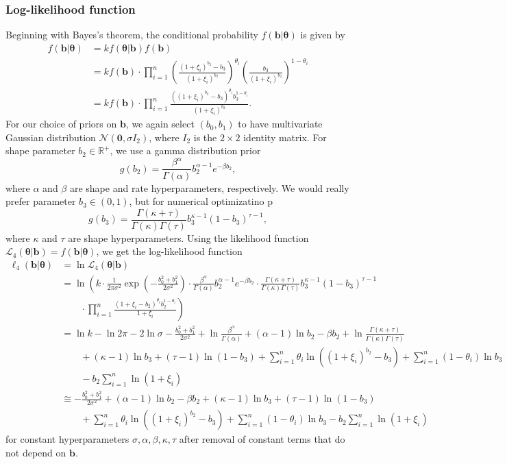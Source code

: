 \documentclass[11pt, letterpaper]{article}
\newcommand{\mbb}[1]{\mathbb{#1}}
\newcommand{\mc}[1]{\mathcal{#1}}
\begin{document}
\subsubsection{Log-likelihood function}
Beginning with Bayes's theorem, the conditional probability $f(\bm b | \bm \theta)$ is given by
\begin{align*}
f(\bm b | \bm \theta) &= k f(\bm \theta | \bm b) f(\bm b) \\
&= k f(\bm b) \cdot \prod_{i=1}^n \left( \frac{(1+\xi_i)^{b_2} -b_3}{(1+\xi_i)^{b_2}}\right)^{\theta_i}\left( \frac{b_3}{(1+\xi_i)^{b_2}}\right)^{1-\theta_i}\\
&= k f(\bm b) \cdot \prod_{i=1}^n \frac{\left((1+\xi_i)^{b_2} -b_3\right)^{\theta_i}b_3^{1-\theta_i}}{(1+\xi_i)^{b_2}}.
\end{align*}
For our choice of priors on $\bm b$, we again select $(b_0, b_1)$ to have multivariate Gaussian distribution $\mc N(\bm 0, \sigma I_2)$, where $I_2$ is the $2 \times 2$ identity matrix. For shape parameter $b_2 \in \mbb R^+$, we use a gamma distribution prior 
$$ g(b_2) = \frac{\beta^\alpha}{\Gamma(\alpha)} b_2^{\alpha-1}e^{-\beta b_2},$$
where $\alpha$ and $\beta$ are shape and rate hyperparameters, respectively. We would really prefer parameter $b_3 \in (0,1)$, but for numerical optimizatino p 
$$ g(b_3) = \frac{\Gamma (\kappa+\tau)}{\Gamma(\kappa)\Gamma(\tau)} b_3^{\kappa-1}(1-b_3)^{\tau -1},$$
where  $\kappa$ and $\tau$ are shape hyperparameters.
Using the likelihood function $\mc L_{4}(\bm \theta | \bm b) = f(\bm b | \bm \theta)$, we get the log-likelihood function 
\begin{align*}
\ell_{4}(\bm b | \bm \theta) &= \ln \mc L_{4}(\bm \theta | \bm b) \\
&= \ln \left( k \cdot \frac{1}{2\pi \sigma^2} \exp\left(-\frac{b_0^2+b_1^2}{2 \sigma^2}\right) \cdot  \frac{\beta^\alpha}{\Gamma(\alpha)} b_2^{\alpha-1}e^{-\beta b_2} \cdot \frac{\Gamma (\kappa+\tau)}{\Gamma(\kappa)\Gamma(\tau)} b_3^{\kappa-1}(1-b_3)^{\tau -1} \right. \\
&\qquad \cdot \left. \prod_{i=1}^n \frac{\left(1+\xi_i -b_2\right)^{\theta_i}b_2^{1-\theta_i}}{1+\xi_i}\right) \\
&= \ln k - \ln 2\pi -2 \ln \sigma - \frac{b_0^2 + b_1^2}{2\sigma^2} + \ln \frac{\beta^\alpha}{\Gamma(\alpha)} + (\alpha-1)\ln b_2 -\beta b_2 + \ln \frac{\Gamma(\kappa + \tau)}{\Gamma(\kappa)\Gamma(\tau)} \\
&\qquad  + (\kappa-1)\ln b_3 + (\tau-1)\ln(1-b_3) + \sum_{i=1}^n \theta_i \ln\left( (1 + \xi_i)^{b_2} -b_3\right) + \sum_{i=1}^n (1-\theta_i)\ln b_3 \\
&\qquad - b_2\sum_{i=1}^n \ln(1+\xi_i) \\
&\cong - \frac{b_0^2 + b_1^2}{2\sigma^2} + (\alpha-1)\ln b_2 -\beta b_2 + 
(\kappa-1)\ln b_3 + (\tau-1)\ln(1-b_3) \\
&\qquad + \sum_{i=1}^n \theta_i \ln\left( (1 + \xi_i)^{b_2} -b_3\right) + \sum_{i=1}^n (1-\theta_i)\ln b_3 - b_2\sum_{i=1}^n \ln(1+\xi_i)
\end{align*}
for constant hyperparameters $\sigma, \alpha, \beta, \kappa, \tau$ after removal of constant terms that do not depend on $\bm b$. 
\end{document}
